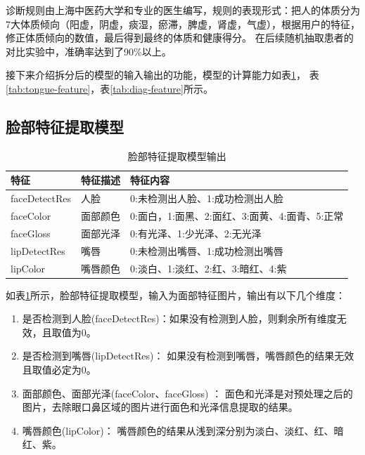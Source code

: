 诊断规则由上海中医药大学和专业的医生编写，规则的表现形式：把人的体质分为7大体质倾向（阳虚，阴虚，痰湿，瘀滞，脾虚，肾虚，气虚），根据用户的特征，修正体质倾向的数值，最后得到最终的体质和健康得分。
在后续随机抽取患者的对比实验中，准确率达到了90\%以上。

接下来介绍拆分后的模型的输入输出的功能，模型的计算能力如表\ref{tab:face-feature}， 表\ref{tab:tongue-feature}，表\ref{tab:diag-feature}所示。
\subsection{脸部特征提取模型}

\begin{table}[h]
    \centering
    \caption{脸部特征提取模型输出}
    \begin{tabular}{lll}
        \toprule
        特征          & 特征描述     & 特征内容 \\ 
        \midrule
        faceDetectRes & 人脸   & 0:未检测出人脸、1:成功检测出人脸  \\
        faceColor     & 面部颜色 & 0:面白，1:面黑、2:面红、3:面黄、4:面青、5:正常 \\
        faceGloss     & 面部光泽 & 0:有光泽、1:少光泽、2:无光泽\\
        lipDetectRes  & 嘴唇   & 0:未检测出嘴唇、1:成功检测出嘴唇\\
        lipColor      & 嘴唇颜色 & 0:淡白、1:淡红、2:红、3:暗红、4:紫   \\
        \bottomrule
    \end{tabular}
    \label{tab:face-feature}
\end{table}

如表\ref{tab:face-feature}所示，脸部特征提取模型，输入为面部特征图片，输出有以下几个维度：

\begin{enumerate}
    \item 是否检测到人脸(faceDetectRes)：如果没有检测到人脸，则剩余所有维度无效，且取值为0。

    \item 是否检测到嘴唇(lipDetectRes)： 如果没有检测到嘴唇，嘴唇颜色的结果无效且取值必定为0。

    \item 面部颜色、面部光泽(faceColor、faceGloss) ： 面色和光泽是对预处理之后的图片，去除眼口鼻区域的图片进行面色和光泽信息提取的结果。

    \item 嘴唇颜色(lipColor)： 嘴唇颜色的结果从浅到深分别为淡白、淡红、红、暗红、紫。
\end{enumerate}


